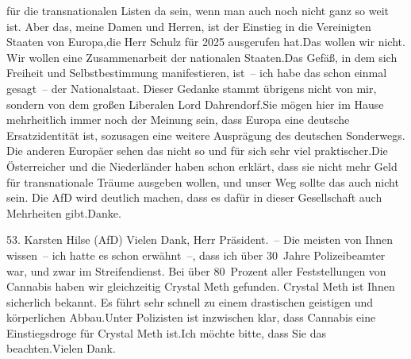 \documentclass{article}
\begin{document}
für die transnationalen Listen da sein, wenn man auch noch nicht ganz so weit ist. Aber das, meine Damen und Herren, ist der Einstieg in die Vereinigten Staaten von Europa,die Herr Schulz für 2025 ausgerufen hat.Das wollen wir nicht. Wir wollen eine Zusammenarbeit der nationalen Staaten.Das Gefäß, in dem sich Freiheit und Selbstbestimmung manifestieren, ist – ich habe das schon einmal gesagt – der Nationalstaat. Dieser Gedanke stammt übrigens nicht von mir, sondern von dem großen Liberalen Lord ­Dahrendorf.Sie mögen hier im Hause mehrheitlich immer noch der Meinung sein, dass Europa eine deutsche Ersatzidentität ist, sozusagen eine weitere Ausprägung des deutschen Sonderwegs. Die anderen Europäer sehen das nicht so und für sich sehr viel praktischer.Die Österreicher und die Niederländer haben schon erklärt, dass sie nicht mehr Geld für transnationale Träume ausgeben wollen, und unser Weg sollte das auch nicht sein. Die AfD wird deutlich machen, dass es dafür in dieser Gesellschaft auch Mehrheiten gibt.Danke.




	53. Karsten Hilse (AfD) Vielen Dank, Herr Präsident. – Die meisten von Ihnen wissen – ich hatte es schon erwähnt –, dass ich über 30 Jahre Polizeibeamter war, und zwar im Streifendienst. Bei über 80 Prozent aller Feststellungen von Cannabis haben wir gleichzeitig Crystal Meth gefunden. Crystal Meth ist Ihnen sicherlich bekannt. Es führt sehr schnell zu einem drastischen geistigen und körperlichen Abbau.Unter Polizisten ist inzwischen klar, dass Cannabis eine Einstiegsdroge für Crystal Meth ist.Ich möchte bitte, dass Sie das beachten.Vielen Dank.
\end{document}
